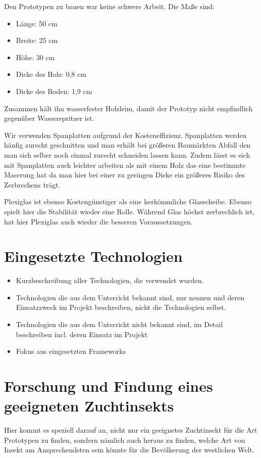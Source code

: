 Den Prototypen zu bauen war keine schwere Arbeit. Die Maße sind:
\begin{itemize}
	\item Länge: 50 cm
	\item Breite: 25 cm
	\item Höhe: 30 cm
	\item Dicke des Holz: 0,8 cm 
	\item Dicke des Boden: 1,9 cm
\end{itemize}

Zusammen hält ihn wasserfester Holzleim, damit der Prototyp nicht empfindlich gegenüber Wasserspritzer ist. 

Wir verwenden Spanplatten aufgrund der Kosteneffizienz. Spanplatten werden häufig zurecht geschnitten und man erhält bei größeren Baumärkten Abfall den man sich selber noch einmal zurecht schneiden lassen kann. Zudem lässt es sich mit Spanplatten auch leichter arbeiten als mit einem Holz das eine bestimmte Maserung hat da man hier bei einer zu geringen Dicke ein größeres Risiko des Zerbrechens trägt.

Plexiglas ist ebenso Kostengünstiger als eine herkömmliche Glasscheibe. Ebenso spielt hier die Stabilität wieder eine Rolle. Während Glas höchst zerbrechlich ist, hat hier Plexiglas auch wieder die besseren Voraussetzungen.


\chapter{Eingesetzte Technologien} \label{sec:tech}
\begin{itemize}
	\item Kurzbeschreibung aller Technologien, die verwendet wurden.
	\item Technologien die aus dem Unterricht bekannt sind, nur nennen und deren  Einsatzzweck im Projekt beschreiben, nicht die Technologien selbst.
	\item Technologien die aus dem Unterricht nicht bekannt sind, im Detail beschreiben incl. deren Einsatz im Projekt
	\item Fokus aus eingesetzten Frameworks
\end{itemize}




\chapter{Forschung und Findung eines geeigneten Zuchtinsekts}
\def \currentAuthor{Leonid Hammer}
Hier kommt es speziell darauf an, nicht nur ein geeignetes Zuchtinsekt für die Art Prototypen zu finden, sondern nämlich auch heraus zu finden, welche Art von Insekt am Ansprechendsten sein könnte für die Bevölkerung der westlichen Welt.

